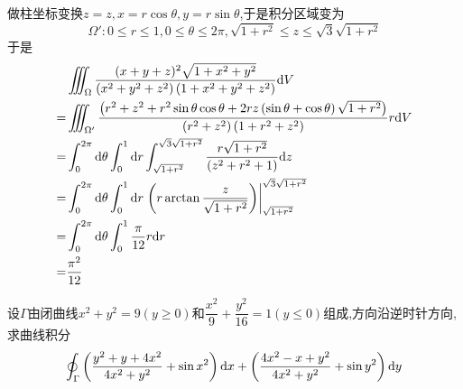 \documentclass{ctexart}
\begin{document}
\begin{solution}
    做柱坐标变换$z=z,x=r\cos\theta,y=r\sin\theta$,于是积分区域变为
    \[\Omega':0\leqslant r\leqslant 1,0\leqslant\theta\leqslant2\pi,\sqrt{1+r^2}\leqslant z\leqslant \sqrt3\sqrt{1+r^2}\]
    于是
    \[\begin{aligned}
        &\iiint_{\Omega}\dfrac{(x+y+z)^2\sqrt{1+x^2+y^2}}{\left(x^2+y^2+z^2\right)\left(1+x^2+y^2+z^2\right)}\mathrm{d} V \\
        =&\iiint_{\Omega'}\dfrac{\left(r^2+z^2+r^2\sin\theta\cos\theta+2rz\left(\sin\theta+\cos\theta\right)\sqrt{1+r^2}\right)}{\left(r^2+z^2\right)\left(1+r^2+z^2\right)}r\mathrm{d} V \\
        =&\int_0^{2\pi}\mathrm{d}\theta\int_0^1\mathrm{d} r\int_{\sqrt{1+r^2}}^{\sqrt3\sqrt{1+r^2}}\dfrac{r\sqrt{1+r^2}}{\left(z^2+r^2+1\right)}\mathrm{d} z \\
        =&\int_0^{2\pi}\mathrm{d}\theta\int_0^1\mathrm{d} r\left.\left(r\arctan\dfrac{z}{\sqrt{1+r^2}}\right)\right|_{\sqrt{1+r^2}}^{\sqrt3\sqrt{1+r^2}} \\
        =&\int_0^{2\pi}\mathrm{d}\theta\int_0^1\dfrac{\pi}{12}r\mathrm{d} r \\
        =&\dfrac{\pi^2}{12}
    \end{aligned}\]

\end{solution}
\begin{problem}[9.(10\songti{分})]
    设$\Gamma$由闭曲线$x^2+y^2=9(y\geqslant0)$和$\dfrac{x^2}{9}+\dfrac{y^2}{16}=1(y\leqslant0)$组成,方向沿逆时针方向,求曲线积分
    \[\oint_{\Gamma}\left(\dfrac{y^2+y+4x^2}{4x^2+y^2}+\sin x^2\right)\mathrm{d} x+\left(\dfrac{4x^2-x+y^2}{4x^2+y^2}+\sin y^2\right)\mathrm{d} y\]

\end{problem}
\end{document}
